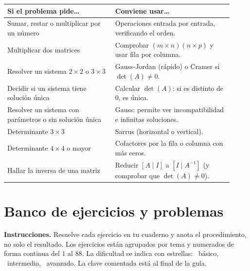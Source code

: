 \documentclass[12pt, letterpaper]{article}
\begin{document}
\begin{center}
\small
\begin{tabular}{@{}p{0.44\linewidth} p{0.48\linewidth}@{}}
  \toprule
  \textbf{Si el problema pide\dots} & \textbf{Conviene usar\dots} \\
  \midrule
  Sumar, restar o multiplicar por un número & Operaciones entrada por
    entrada, verificando el orden. \\
  Multiplicar dos matrices & Comprobar $(m\times n)(n\times p)$ y usar
    fila por columna. \\
  Resolver un sistema $2\times2$ o $3\times3$ & Gauss-Jordan (rápido) o
    Cramer si $\det(A)\neq0$. \\
  Decidir si un sistema tiene solución única & Calcular $\det(A)$: si es
    distinto de $0$, es única. \\
  Resolver un sistema con parámetros o sin solución única & Gauss: permite
    ver incompatibilidad e infinitas soluciones. \\
  Determinante $3\times3$ & Sarrus (horizontal o vertical). \\
  Determinante $4\times4$ o mayor & Cofactores por la fila o columna con
    más ceros. \\
  Hallar la inversa de una matriz & Reducir $[A\mid I]$ a $[I\mid A^{-1}]$
    (y comprobar que $\det(A)\neq0$). \\
  \bottomrule
\end{tabular}
\end{center}

\section{Banco de ejercicios y problemas}

\begin{cuadroinfo}
  \small
  \textbf{Instrucciones.} Resuelve cada ejercicio en tu cuaderno y anota el
  procedimiento, no solo el resultado. Los ejercicios están agrupados por
  tema y numerados de forma continua del $1$ al $88$. La dificultad se indica
  con estrellas: \facil\ básico, \medio\ intermedio, \dificil\ avanzado.
  La clave comentada está al final de la guía.
\end{cuadroinfo}
\end{document}
